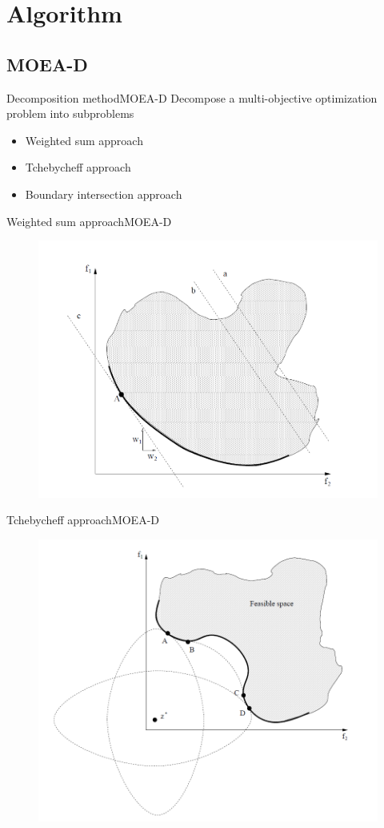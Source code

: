 \section{Algorithm}

\subsection{MOEA-D}

\begin{frame}{Decomposition method}{MOEA-D}
Decompose a multi-objective optimization problem into subproblems
\begin{itemize}
	\item Weighted sum approach
	\item Tchebycheff approach
	\item Boundary intersection approach
\end{itemize}
\end{frame}

\begin{frame}{Weighted sum approach}{MOEA-D}
	\begin{figure}
		\centering
		\includegraphics[width=.6\linewidth]{figure/weighted_sum}
		\label{fig:weighted_sum}
	\end{figure}
\end{frame}

\begin{frame}{Tchebycheff approach}{MOEA-D}
	\begin{figure}
		\centering
		\includegraphics[width=.6\linewidth]{figure/tchebycheff}
		\label{fig:tchebycheff}
	\end{figure}	
\end{frame}


